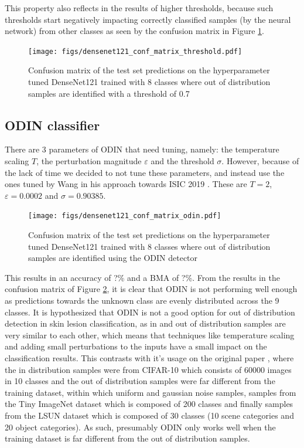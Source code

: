         This property also reflects in the results of higher thresholds, because such thresholds start negatively impacting correctly classified samples (by the neural network) from other classes as seen by the confusion matrix in Figure \ref{fig:densenet121_conf_matrix_threshold}. \par 
        \begin{figure}[ht]
            \centering
            \texttt{[image: figs/densenet121\_conf\_matrix\_threshold.pdf]}
            \caption{Confusion matrix of the test set predictions on the hyperparameter tuned DenseNet121 trained with 8 classes where out of distribution samples are identified with a threshold of 0.7}
            \label{fig:densenet121_conf_matrix_threshold}
        \end{figure}

        
    \subsection{ODIN classifier}
        There are 3 parameters of \ac{ODIN} that need tuning, namely: the temperature scaling $T$, the perturbation magnitude $\varepsilon$ and the threshold $\sigma$. However, because of the lack of time we decided to not tune these parameters, and instead use the ones tuned by Wang in his approach towards ISIC 2019 \cite{Wang}. These are $T = 2$, $\varepsilon = 0.0002$ and $\sigma = 0.90385$. \par
        \begin{figure}[ht]
            \centering
            \texttt{[image: figs/densenet121\_conf\_matrix\_odin.pdf]}
            \caption{Confusion matrix of the test set predictions on the hyperparameter tuned DenseNet121 trained with 8 classes where out of distribution samples are identified using the ODIN detector}
            \label{fig:densenet121_conf_matrix_odin}
        \end{figure}
        
        This results in an accuracy of ?\% and a \ac{BMA} of ?\%. From the results in the confusion matrix of Figure \ref{fig:densenet121_conf_matrix_odin}, it is clear that ODIN is not performing well enough as predictions towards the unknown class are evenly distributed across the 9 classes. It is hypothesized that ODIN is not a good option for out of distribution detection in skin lesion classification, as in and out of distribution samples are very similar to each other, which means that techniques like temperature scaling and adding small perturbations to the inputs have a small impact on the classification results. This contrasts with it's usage on the original paper \cite{odin}, where the in distribution samples were from CIFAR-10 \cite{?} which consists of 60000 images in 10 classes and the out of distribution samples were far different from the training dataset, within which uniform and gaussian noise samples, samples from the Tiny ImageNet dataset \cite{?} which is composed of 200 classes and finally samples from the LSUN dataset \cite{?} which is composed of 30 classes (10 scene categories and 20 object categories). As such, presumably ODIN only works well when the training dataset is far different from the out of distribution samples. \par 
